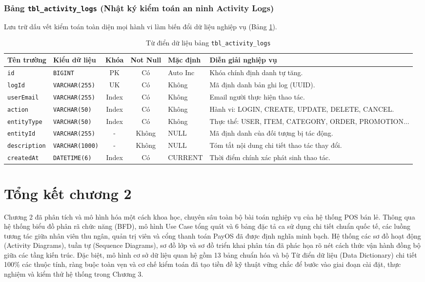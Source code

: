 \subsubsection{Bảng \texttt{tbl\_activity\_logs} (Nhật ký kiểm toán an ninh Activity Logs)}
Lưu trữ dấu vết kiểm toán toàn diện mọi hành vi làm biến đổi dữ liệu nghiệp vụ (Bảng \ref{tab:tbl_activity_logs}).

\begin{table}[htbp]
\centering
\caption{Từ điển dữ liệu bảng \texttt{tbl\_activity\_logs}}
\label{tab:tbl_activity_logs}
\vspace{2mm}
\begin{tabularx}{\textwidth}{|p{2.5cm}|p{2.8cm}|c|c|p{1.8cm}|X|}
\hline
\textbf{Tên trường} & \textbf{Kiểu dữ liệu} & \textbf{Khóa} & \textbf{Not Null} & \textbf{Mặc định} & \textbf{Diễn giải nghiệp vụ} \\ \hline
\texttt{id} & \texttt{BIGINT} & PK & Có & Auto Inc & Khóa chính định danh tự tăng. \\ \hline
\texttt{logId} & \texttt{VARCHAR(255)} & UK & Có & Không & Mã định danh bản ghi log (UUID). \\ \hline
\texttt{userEmail} & \texttt{VARCHAR(255)} & Index & Có & Không & Email người thực hiện thao tác. \\ \hline
\texttt{action} & \texttt{VARCHAR(50)} & Index & Có & Không & Hành vi: LOGIN, CREATE, UPDATE, DELETE, CANCEL. \\ \hline
\texttt{entityType} & \texttt{VARCHAR(50)} & Index & Có & Không & Thực thể: USER, ITEM, CATEGORY, ORDER, PROMOTION... \\ \hline
\texttt{entityId} & \texttt{VARCHAR(255)} & - & Không & NULL & Mã định danh của đối tượng bị tác động. \\ \hline
\texttt{description} & \texttt{VARCHAR(1000)}& - & Không & NULL & Tóm tắt nội dung chi tiết thao tác thay đổi. \\ \hline
\texttt{createdAt} & \texttt{DATETIME(6)} & Index & Có & CURRENT & Thời điểm chính xác phát sinh thao tác. \\ \hline
\end{tabularx}
\end{table}

\section{Tổng kết chương 2}
Chương 2 đã phân tích và mô hình hóa một cách khoa học, chuyên sâu toàn bộ bài toán nghiệp vụ của hệ thống POS bán lẻ. Thông qua hệ thống biểu đồ phân rã chức năng (BFD), mô hình Use Case tổng quát và 6 bảng đặc tả ca sử dụng chi tiết chuẩn quốc tế, các luồng tương tác giữa nhân viên thu ngân, quản trị viên và cổng thanh toán PayOS đã được định nghĩa minh bạch. Hệ thống các sơ đồ hoạt động (Activity Diagrams), tuần tự (Sequence Diagrams), sơ đồ lớp và sơ đồ triển khai phân tán đã phác họa rõ nét cách thức vận hành đồng bộ giữa các tầng kiến trúc. Đặc biệt, mô hình cơ sở dữ liệu quan hệ gồm 13 bảng chuẩn hóa và bộ Từ điển dữ liệu (Data Dictionary) chi tiết 100\% các thuộc tính, ràng buộc toàn vẹn và cơ chế kiểm toán đã tạo tiền đề kỹ thuật vững chắc để bước vào giai đoạn cài đặt, thực nghiệm và kiểm thử hệ thống trong Chương 3.

